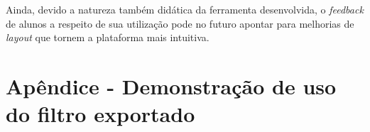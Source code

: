 \documentclass[12pt,a4paper]{report}
\begin{document}
  Ainda, devido a natureza também didática da ferramenta desenvolvida, o \textit{feedback} de alunos a respeito
  de sua utilização pode no futuro apontar para melhorias de \textit{layout} que tornem a plataforma mais
  intuitiva.

\printbibliography[heading=bibnumbered]

\chapter{Apêndice - Demonstração de uso do filtro exportado}

  
\end{document}
